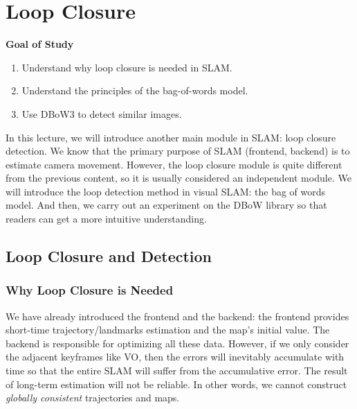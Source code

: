 \chapter{Loop Closure}
\label{cpt:11}
\begin{mdframed}  
	\textbf{Goal of Study}
	\begin{enumerate}[labelindent=0em,leftmargin=1.5em]
		\item Understand why loop closure is needed in SLAM.
		\item Understand the principles of the bag-of-words model. 
		\item Use DBoW3 to detect similar images. 
	\end{enumerate}
\end{mdframed}

In this lecture, we will introduce another main module in SLAM: loop closure detection. We know that the primary purpose of SLAM (frontend, backend) is to estimate camera movement. However, the loop closure module is quite different from the previous content, so it is usually considered an independent module. We will introduce the loop detection method in visual SLAM: the bag of words model. And then, we carry out an experiment on the DBoW library so that readers can get a more intuitive understanding.
\newpage


\newpage
\section{Loop Closure and Detection}
\subsection{Why Loop Closure is Needed}
We have already introduced the frontend and the backend: the frontend provides short-time trajectory/landmarks estimation and the map's initial value. The backend is responsible for optimizing all these data. However, if we only consider the adjacent keyframes like VO, then the errors will inevitably accumulate with time so that the entire SLAM will suffer from the accumulative error. The result of long-term estimation will not be reliable. In other words, we cannot construct \textit{globally consistent} trajectories and maps.

